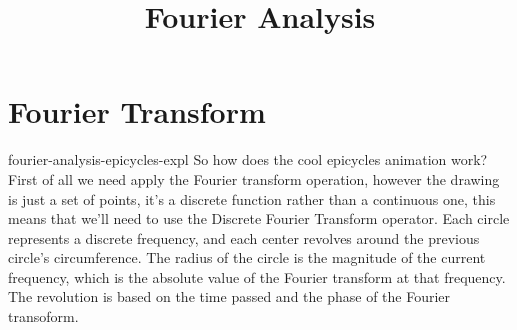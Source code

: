 \documentclass[preview]{standalone}
\begin{document}
\title{Fourier Analysis}
\genpage

\section{Fourier Transform}

\begin{snippet}{fourier-analysis-epicycles-expl}
    So how does the cool epicycles animation work?
    First of all we need apply the Fourier transform operation, however
    the drawing is just a set of points, it's a discrete function rather
    than a continuous one, this means that we'll need to use the
    Discrete Fourier Transform operator.
    Each circle represents a discrete frequency, and each center revolves
    around the previous circle's circumference. The radius of the circle
    is the magnitude of the current frequency, which is the absolute value
    of the Fourier transform at that frequency. The revolution is based
    on the time passed and the phase of the Fourier transoform.
\end{snippet}

\end{document}
